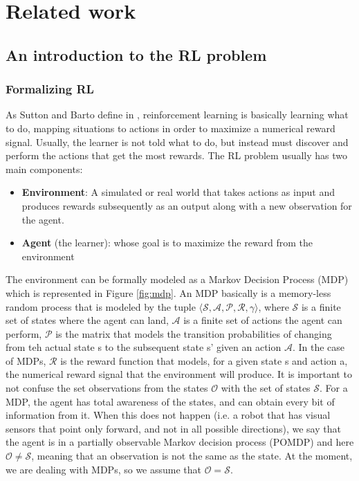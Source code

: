 
\chapter{Related work}
\label{cha:related-work}

\section{An introduction to the RL problem}
\label{sec:intro-rl}

\subsection{Formalizing RL}
\label{sec:form-intro-rl}
As Sutton and Barto define in \cite{intro_rl}, reinforcement learning is basically learning what to do, mapping situations to actions in order to maximize a numerical reward signal. Usually, the learner is not told what to do, but instead must discover and perform the actions that get the most rewards. The RL problem usually has two main components:

\begin{itemize}
	\item \textbf{Environment}: A simulated or real world that takes actions as input and produces rewards subsequently as an output along with a new observation for the agent.
	\item \textbf{Agent} (the learner): whose goal is to maximize the reward from the environment
\end{itemize}

The environment can be formally modeled as a Markov Decision Process (MDP) which is represented in Figure \ref{fig:mdp}. An MDP basically is a memory-less random process that is modeled by the tuple $\langle \mathcal{S,A,P,R},\gamma \rangle$, where $\mathcal{S}$ is a finite set of states where the agent can land, $\mathcal{A}$ is a finite set of actions the agent can perform, $\mathcal{P}$ is the matrix that models the transition probabilities of changing from teh actual state s to the subsequent state s' given an action $\mathcal{A}$. In the case of MDPs, $\mathcal{R}$ is the reward function that models, for a given state s and action a, the numerical reward signal that the environment will produce. It is important to not confuse the set observations from the states $\mathcal{O}$ with the set of states $\mathcal{S}$. For a MDP, the agent has total awareness of the states, and can obtain every bit of information from it. When this does not happen (i.e. a robot that has visual sensors that point only forward, and not in all possible directions), we say that the agent is in a partially observable Markov decision process (POMDP) and here $\mathcal{O} \neq \mathcal{S}$, meaning that an observation is not the same as the state. At the moment, we are dealing with MDPs, so we assume that $\mathcal{O} = \mathcal{S}$.

